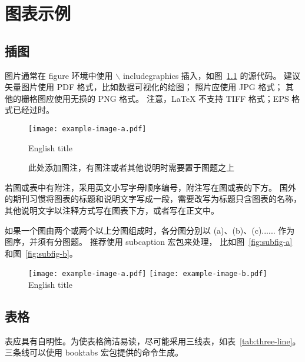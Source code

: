 
\chapter{图表示例}

\section{插图}
  
图片通常在 figure 环境中使用\cite{dupont1974bone}\cite{jianduju1994}  $\backslash$ includegraphics 插入，如图~\ref{fig:example} 的源代码。
建议矢量图片使用 PDF 格式，比如数据可视化的绘图；
照片应使用 JPG 格式；
其他的栅格图应使用无损的 PNG 格式。
注意，LaTeX 不支持 TIFF 格式；EPS 格式已经过时。

\begin{figure}[h]
  \centering
  \texttt{[image: example-image-a.pdf]}
  \caption*{此处添加图注，有图注或者其他说明时需要置于图题之上}
   {English title}

  \label{fig:example}
\end{figure}

若图或表中有附注，采用英文小写字母顺序编号，附注写在图或表的下方。
国外的期刊习惯将图表的标题和说明文字写成一段，需要改写为标题只含图表的名称，其他说明文字以注释方式写在图表下方，或者写在正文中。

如果一个图由两个或两个以上分图组成时，各分图分别以 (a)、(b)、(c)...... 作为图序，并须有分图题。
推荐使用 subcaption 宏包来处理， 比如图~\ref{fig:subfig-a} 和图~\ref{fig:subfig-b}。



\begin{figure}[h]
  \centering
    {\texttt{[image: example-image-a.pdf]}}
    {\texttt{[image: example-image-b.pdf]}}
   {English title}

  \label{fig:multi-image}
\end{figure}



\section{表格}

表应具有自明性。为使表格简洁易读，尽可能采用三线表，如表~\ref{tab:three-line}。
三条线可以使用 booktabs 宏包提供的命令生成。

